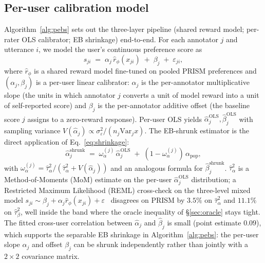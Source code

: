 \documentclass{article}
\begin{document}
\subsection{Per-user calibration model}\label{sec:t1-method}
Algorithm~\ref{alg:pebs} sets out the three-layer pipeline (shared
reward model; per-rater OLS calibrator; EB shrinkage) end-to-end.
For each annotator $j$ and utterance $i$, we model the user's continuous
preference score as
\begin{equation}
  s_{ji} \;=\; \alpha_j\,\hat r_\phi(x_{ji}) \;+\; \beta_j \;+\; \varepsilon_{ji},
  \label{eq:linear-model}
\end{equation}
where $\hat r_\phi$ is a shared reward model fine-tuned on pooled PRISM
preferences and $(\alpha_j,\beta_j)$ is a per-user linear calibrator:
$\alpha_j$ is the per-annotator multiplicative slope (the units in
which annotator $j$ converts a unit of model reward into a unit of
self-reported score) and $\beta_j$ is the per-annotator additive offset
(the baseline score $j$ assigns to a zero-reward response). Per-user OLS yields
$\hat\alpha_j^{\mathrm{OLS}},\hat\beta_j^{\mathrm{OLS}}$ with sampling
variance $V(\hat\alpha_j)\propto \sigma_\varepsilon^2/(n_j\mathrm{Var}_j x)$.
The EB-shrunk estimator is the direct application of
Eq.~\eqref{eq:shrinkage}:
\begin{equation}
  \hat\alpha_j^{\mathrm{shrunk}}
  \;=\;
  \omega_\alpha^{(j)}\,\hat\alpha_j^{\mathrm{OLS}}
  \;+\;(1-\omega_\alpha^{(j)})\,\alpha_{\mathrm{pop}},
\end{equation}
with $\omega_\alpha^{(j)} = \hat\tau_\alpha^2 / (\hat\tau_\alpha^2 + V(\hat\alpha_j))$
and an analogous formula for $\hat\beta_j^{\mathrm{shrunk}}$.
$\hat\tau_\alpha^2$ is a Method-of-Moments (MoM) estimate on the
per-user $\hat\alpha_j^{\mathrm{OLS}}$ distribution; a Restricted
Maximum Likelihood (REML) cross-check on the three-level mixed model
$s_{ji} \sim \beta_j + \alpha_j\hat r_\phi(x_{ji}) +
\varepsilon$~\citep{seabold2010statsmodels,pinheiro2000mixed} disagrees
on PRISM by $3.5\%$ on $\hat\tau_\alpha^2$ and $11.1\%$ on
$\hat\tau_\beta^2$, well inside the band where the oracle inequality of
\S\ref{sec:oracle} stays tight. The fitted cross-user correlation
between $\hat\alpha_j$ and $\hat\beta_j$ is small (point estimate
$0.09$), which supports the separable EB shrinkage in
Algorithm~\ref{alg:pebs}: the per-user slope $\alpha_j$ and offset
$\beta_j$ can be shrunk independently rather than jointly with a
$2\!\times\!2$ covariance matrix.
\end{document}
